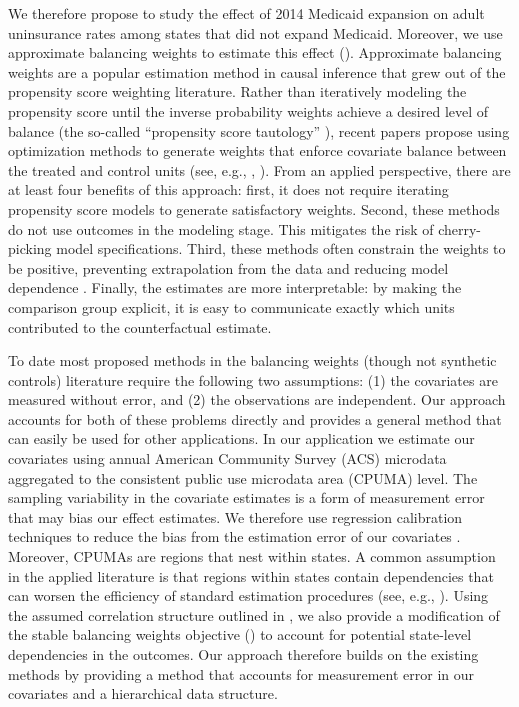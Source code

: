 \documentclass[article]{imsart}
\theoremstyle{plain}
\theoremstyle{remark}
\begin{document}
We therefore propose to study the effect of 2014 Medicaid expansion on adult uninsurance rates among states that did not expand Medicaid. Moreover, we use approximate balancing weights to estimate this effect (\cite{wang2017minimal}). Approximate balancing weights are a popular estimation method in causal inference that grew out of the propensity score weighting literature. Rather than iteratively modeling the propensity score until the inverse probability weights achieve a desired level of balance (the so-called ``propensity score tautology'' \cite{imai2014covariate}), recent papers propose using optimization methods to generate weights that enforce covariate balance between the treated and control units (see, e.g., \cite{imai2014covariate}, \cite{zubizarreta2015stable}). From an applied perspective, there are at least four benefits of this approach: first, it does not require iterating propensity score models to generate satisfactory weights. Second, these methods do not use outcomes in the modeling stage. This mitigates the risk of cherry-picking model specifications. Third, these methods often constrain the weights to be positive, preventing extrapolation from the data and reducing model dependence \cite{zubizarreta2015stable}. Finally, the estimates are more interpretable: by making the comparison group explicit, it is easy to communicate exactly which units contributed to the counterfactual estimate.

To date most proposed methods in the balancing weights (though not synthetic controls) literature require the following two assumptions: (1) the covariates are measured without error, and (2) the observations are independent. Our approach accounts for both of these problems directly and provides a general method that can easily be used for other applications. In our application we estimate our covariates using annual American Community Survey (ACS) microdata aggregated to the consistent public use microdata area (CPUMA) level. The sampling variability in the covariate estimates is a form of measurement error that may bias our effect estimates. We therefore use regression calibration techniques to reduce the bias from the estimation error of our covariates \cite{gleser1992importance}. Moreover, CPUMAs are regions that nest within states. A common assumption in the applied literature is that regions within states contain dependencies that can worsen the efficiency of standard estimation procedures (see, e.g., \cite{cameron2015practitioner}). Using the assumed correlation structure outlined in \cite{kloek1981ols}, we also provide a modification of the stable balancing weights objective (\cite{zubizarreta2015stable}) to account for potential state-level dependencies in the outcomes. Our approach therefore builds on the existing methods by providing a method that accounts for measurement error in our covariates and a hierarchical data structure.
\end{document}
